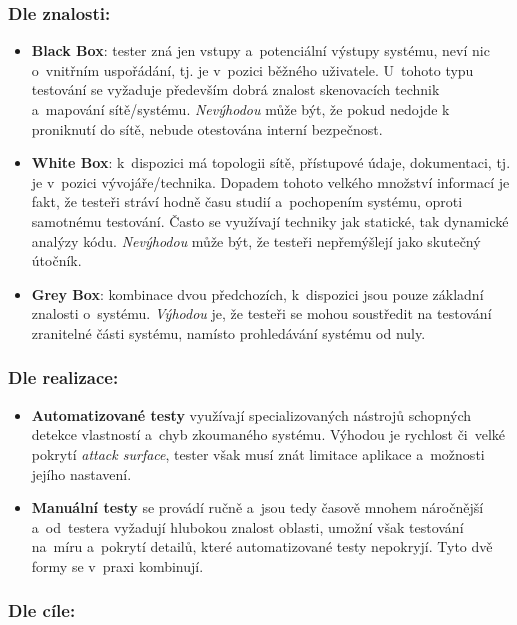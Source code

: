 \subsubsection*{Dle znalosti:}

\begin{itemize}
    \item \textbf{Black Box}: tester zná jen vstupy a~potenciální výstupy systému, neví nic o~vnitřním uspořádání, tj. je v~pozici běžného uživatele. U~tohoto typu testování se vyžaduje především dobrá znalost skenovacích technik a~mapování sítě/systému. \textit{Nevýhodou} může být, že pokud nedojde k proniknutí do sítě, nebude otestována interní bezpečnost.  
    
    \item \textbf{White Box}: k~dispozici má topologii sítě, přístupové údaje, dokumentaci, tj. je v~pozici vývojáře/technika. Dopadem tohoto velkého množství informací je fakt, že testeři stráví hodně času studií a~pochopením systému, oproti samotnému testování. Často se využívají techniky jak statické, tak dynamické analýzy kódu. \textit{Nevýhodou} může být, že testeři nepřemýšlejí jako skutečný útočník.
    
    \item \textbf{Grey Box}: kombinace dvou předchozích, k~dispozici jsou pouze základní znalosti o~systému. \textit{Výhodou} je, že testeři se mohou soustředit na testování zranitelné části systému, namísto prohledávání systému od nuly. 
\end{itemize}
 
\subsubsection*{Dle realizace:}

\begin{itemize}
    \item \textbf{Automatizované testy} využívají specializovaných nástrojů schopných detekce vlastností a~chyb zkoumaného systému. Výhodou je rychlost či~velké pokrytí \emph{attack surface}, tester však musí znát limitace aplikace a~možnosti jejího nastavení.
    
    \item \textbf{Manuální testy} se provádí ručně a~jsou tedy časově mnohem náročnější a~od~testera vyžadují hlubokou znalost oblasti, umožní však testování na~míru a~pokrytí detailů, které automatizované testy nepokryjí. Tyto dvě formy se v~praxi kombinují.
\end{itemize}
\subsubsection*{Dle cíle:}

